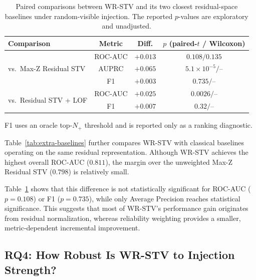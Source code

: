 \documentclass[informatics,article,submit,moreauthors]{Definitions/mdpi}
\newcommand{\rev}[1]{{\color{revisionblue}#1}}
\begin{document}
\begin{table}[t]
    \centering
    \caption{\rev{Paired comparisons between WR-STV and its two closest
        residual-space baselines under random-visible injection. The
        reported \(p\)-values are exploratory and unadjusted.}}
    \label{tab:extra-baseline-stats}
    \begin{tabular}{lccc}
        \toprule
        \textbf{Comparison} & \textbf{Metric} & \textbf{Diff.} &
        \textbf{\(p\) (paired-\(t\) / Wilcoxon)} \\
        \midrule
        \multirow{3}{*}{vs.\ Max-Z Residual STV}
        & ROC-AUC & \(+0.013\) & \(0.108 / 0.135\) \\
        & AUPRC   & \(+0.065\) & \(5.1\times10^{-5} / \text{--}\) \\
        & F1      & \(+0.003\) & \(0.735 / \text{--}\) \\
        \midrule
        \multirow{2}{*}{vs.\ Residual STV + LOF}
        & ROC-AUC & \(+0.025\) & \(0.0026 / \text{--}\) \\
        & F1      & \(+0.007\) & \(0.32 / \text{--}\) \\
        \bottomrule
    \end{tabular}

    \vspace{3pt}
    \footnotesize
    \rev{F1 uses an oracle top-\(N_{+}\) threshold and is reported only as
    a ranking diagnostic.}
\end{table}

Table~\ref{tab:extra-baselines} further compares WR-STV with classical
baselines operating on the same residual representation. Although WR-STV
achieves the highest overall ROC-AUC (\(0.811\)), the margin over the
unweighted Max-Z Residual STV (\(0.798\)) is relatively small.

Table~\ref{tab:extra-baseline-stats} shows that this difference is not
statistically significant for ROC-AUC (\(p=0.108\)) or F1
(\(p=0.735\)), while only Average Precision reaches statistical
significance. This suggests that most of WR-STV's performance gain
originates from residual normalization, whereas reliability weighting
provides a smaller, metric-dependent incremental improvement.

\subsection{RQ4: How Robust Is WR-STV to Injection Strength?}
\label{sec:results-sensitivity}
\end{document}

